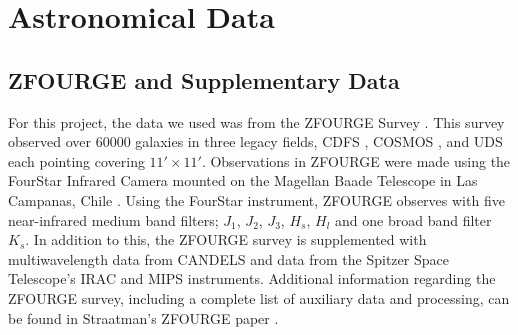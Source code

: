 \documentclass[12pt]{iopart}
\begin{document}
\section{Astronomical Data}
\subsection{ZFOURGE and Supplementary Data}
For this project, the data we used was from the ZFOURGE Survey \cite{straatman_fourstar_2016}. This survey observed over 60000 galaxies in three legacy fields, CDFS \cite{giacconi_chandra_2002}, COSMOS \cite{scoville_cosmic_2007}, and UDS \cite{lawrence_ukirt_2007} each pointing covering $11' \times 11'$. Observations in ZFOURGE were made using the FourStar Infrared Camera mounted on the Magellan Baade Telescope in Las Campanas, Chile \cite{persson_fourstar_2013}. Using the FourStar instrument, ZFOURGE observes with five near-infrared medium band filters; $J_1$, $J_2$, $J_3$, $H_s$, $H_l$ and one broad band filter $K_s$. In addition to this, the ZFOURGE survey is supplemented with multiwavelength data from CANDELS \cite{grogin_candels_2011, koekemoer_candels_2011} and data from the Spitzer Space Telescope's IRAC \cite{fazio_infrared_2004} and MIPS \cite{rieke_multiband_2004} instruments. Additional information regarding the ZFOURGE survey, including a complete list of auxiliary data and processing, can be found in Straatman's ZFOURGE paper \cite{straatman_fourstar_2016}.
\end{document}
